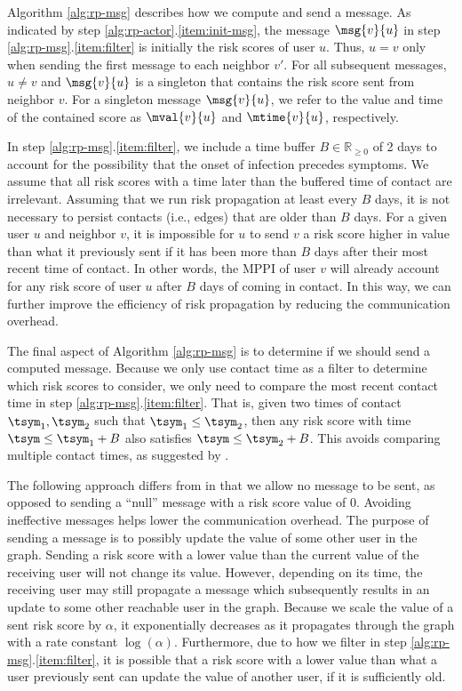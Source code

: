 \par Algorithm \ref{alg:rp-msg} describes how we compute and send a message. As indicated by step \ref{alg:rp-actor}.\ref{item:init-msg}, the message $\msg{v}{u}$ in step \ref{alg:rp-msg}.\ref{item:filter} is initially the risk scores of user $u$. Thus, $u = v$ only when sending the first message to each neighbor $v'$. For all subsequent messages, $u \neq v$ and $\msg{v}{u}$ is a singleton that contains the risk score sent from neighbor $v$. For a singleton message $\msg{v}{u}$, we refer to the value and time of the contained score as $\mval{v}{u}$ and $\mtime{v}{u}$, respectively.

\par In step \ref{alg:rp-msg}.\ref{item:filter}, we include a time buffer $B \in \mathbb{R}_{\geq 0}$ of 2 days to account for the possibility that the onset of infection precedes symptoms. We assume that all risk scores with a time later than the buffered time of contact are irrelevant. Assuming that we run risk propagation at least every $B$ days, it is not necessary to persist contacts (i.e., edges) that are older than $B$ days. For a given user $u$ and neighbor $v$, it is impossible for $u$ to send $v$ a risk score higher in value than what it previously sent if it has been more than $B$ days after their most recent time of contact. In other words, the MPPI of user $v$ will already account for any risk score of user $u$ after $B$ days of coming in contact. In this way, we can further improve the efficiency of risk propagation by reducing the communication overhead.

\par The final aspect of Algorithm \ref{alg:rp-msg} is to determine if we should send a computed message. Because we only use contact time as a filter to determine which risk scores to consider, we only need to compare the most recent contact time in step \ref{alg:rp-msg}.\ref{item:filter}. That is, given two times of contact $\tsym_1, \tsym_2$ such that $\tsym_1 \leq \tsym_2$, then any risk score with time $\tsym \leq \tsym_1 + B$ also satisfies $\tsym \leq \tsym_2 + B$. This avoids comparing multiple contact times, as suggested by \cite{Ayday2021}. 

\par The following approach differs from \cite{Ayday2021} in that we allow no message to be sent, as opposed to sending a ``null'' message with a risk score value of 0. Avoiding ineffective messages helps lower the communication overhead. The purpose of sending a message is to possibly update the value of some other user in the graph. Sending a risk score with a lower value than the current value of the receiving user will not change its value. However, depending on its time, the receiving user may still propagate a message which subsequently results in an update to some other reachable user in the graph. Because we scale the value of a sent risk score by $\alpha$, it exponentially decreases as it propagates through the graph with a rate constant $\log(\alpha)$. Furthermore, due to how we filter in step \ref{alg:rp-msg}.\ref{item:filter}, it is possible that a risk score with a lower value than what a user previously sent can update the value of another user, if it is sufficiently old.

